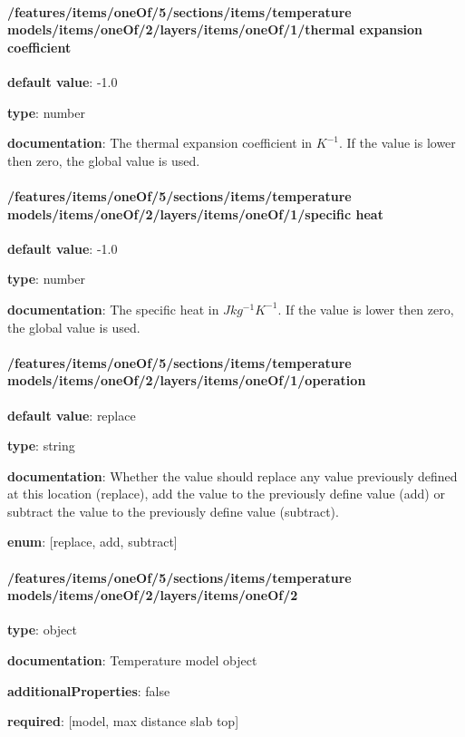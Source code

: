\begin{itemized}
\end{itemized}\paragraph{/features/items/oneOf/5/sections/items/temperature models/items/oneOf/2/layers/items/oneOf/1/thermal expansion coefficient} \begin{itemized}
\item {\bf default value}: -1.0
\item {\bf type}: number
\item {\bf documentation}: The thermal expansion coefficient in $K^{-1}$. If the value is lower then zero, the global value is used.
\end{itemized}\paragraph{/features/items/oneOf/5/sections/items/temperature models/items/oneOf/2/layers/items/oneOf/1/specific heat} \begin{itemized}
\item {\bf default value}: -1.0
\item {\bf type}: number
\item {\bf documentation}: The specific heat in $J kg^{-1} K^{-1}$. If the value is lower then zero, the global value is used.
\end{itemized}\paragraph{/features/items/oneOf/5/sections/items/temperature models/items/oneOf/2/layers/items/oneOf/1/operation} \begin{itemized}
\item {\bf default value}: replace
\item {\bf type}: string
\item {\bf documentation}: Whether the value should replace any value previously defined at this location (replace), add the value to the previously define value (add) or subtract the value to the previously define value (subtract).
\item {\bf enum}: [replace, add, subtract]\end{itemized}\paragraph{/features/items/oneOf/5/sections/items/temperature models/items/oneOf/2/layers/items/oneOf/2} \begin{itemized}
\item {\bf type}: object
\item {\bf documentation}: Temperature model object
\item {\bf additionalProperties}: false
\item {\bf required}: [model, max distance slab top]\end{itemized}
